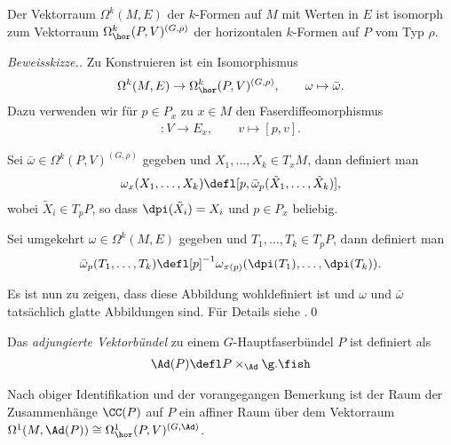 \documentclass[%
	paper=a5,%
	fleqn,%
	DIV=18,%
	BCOR=0mm,
	fontsize=11pt,
	titlepage=false,%
	bibliography=totoc,
	DIV=18,%
	twoside=true,
	pdftitle=Riemannsche Geometrie,
	pdfauthor=Uwe Semmelmann,
	numbers=noendperiod]%
	{scrbook}
\begin{document}
\begin{prop}
\label{prop:Identifikation-E-Formen-auf-M}
Der Vektorraum
$\Omega^k(M,E)$ der $k$-Formen auf $M$ mit Werten in $E$ ist isomorph zum
Vektorraum $\Omega_\hor^k(P,V)^{(G,\rho)}$ der horizontalen $k$-Formen auf
$P$ vom Typ $\rho$.\fish
\end{prop}
\begin{proof}[Beweisskizze.]
Zu Konstruieren ist ein Isomorphismus
\begin{align*}
\Omega^k(M,E) \to \Omega_\hor^k(P,V)^{(G,\rho)},\qquad \omega\mapsto
\bar{\omega}.
\end{align*}
Dazu verwenden wir für $p\in P_x$ zu $x\in M$ den Faserdiffeomorphismus
\begin{align*}
[p]: V\to E_x,\qquad v\mapsto [p,v].
\end{align*}

Sei $\bar{\omega}\in \Omega^k(P,V)^{(G,\rho)}$ gegeben und $X_1,\ldots,X_k\in
T_xM$, dann definiert man
\begin{align*}
\omega_x(X_1,\ldots,X_k) \defl
[p,\bar{\omega}_p(\tilde{X}_1,\ldots,\tilde{X}_k)],
\end{align*}
wobei $\tilde{X}_i\in T_pP$, so dass $\dpi(\tilde{X}_i) = X_i$ und $p\in P_x$
beliebig.

Sei umgekehrt $\omega\in \Omega^k(M,E)$ gegeben und $T_1,\ldots,T_k\in T_pP$,
dann definiert man
\begin{align*}
\bar{\omega}_p(T_1,\ldots,T_k) \defl
[p]^{-1}\omega_{\pi(p)}(\dpi(T_1),\ldots,\dpi(T_k)).
\end{align*}

Es ist nun zu zeigen, dass diese Abbildung wohldefiniert ist und $\omega$ und
$\bar{\omega}$ tatsächlich glatte Abbildungen sind. Für Details siehe \cite[Satz
3.5]{Baum:2009wk}.\qed
\end{proof}

\begin{defn}
Das \emph{adjungierte Vektorbündel} zu einem $G$-Hauptfaserbündel $P$ ist
definiert als
\begin{align*}
\Ad(P) \defl P\times_\Ad \g.\fish
\end{align*}
\end{defn}

\begin{rem}
Nach obiger Identifikation und der vorangegangen Bemerkung ist der Raum der
Zusammenhänge $\CC(P)$ auf $P$ ein affiner Raum über dem Vektorraum
$\Omega^1(M,\Ad(P))\cong \Omega^1_\hor(P,V)^{(G,\Ad)}$.\map
\end{rem}
\end{document}
